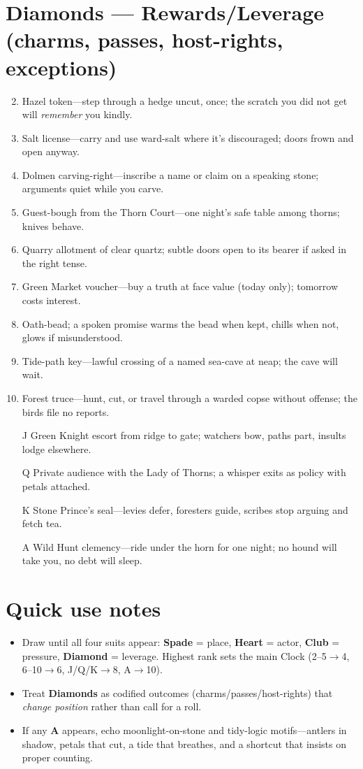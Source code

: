 \section{Diamonds --- Rewards/Leverage (charms, passes, host-rights, exceptions)}
\label{sec:aelinnel-rewards}
\begin{enumerate}
\setcounter{enumi}{1}
\item Hazel token---step through a hedge uncut, once; the scratch you did not get will \emph{remember} you kindly.
\item Salt license---carry and use ward-salt where it's discouraged; doors frown and open anyway.
\item Dolmen carving-right---inscribe a name or claim on a speaking stone; arguments quiet while you carve.
\item Guest-bough from the Thorn Court---one night's safe table among thorns; knives behave.
\item Quarry allotment of clear quartz; subtle doors open to its bearer if asked in the right tense.
\item Green Market voucher---buy a truth at face value (today only); tomorrow costs interest.
\item Oath-bead; a spoken promise warms the bead when kept, chills when not, glows if misunderstood.
\item Tide-path key---lawful crossing of a named sea-cave at neap; the cave will wait.
\item Forest truce---hunt, cut, or travel through a warded copse without offense; the birds file no reports.
\item[J] Green Knight escort from ridge to gate; watchers bow, paths part, insults lodge elsewhere.
\item[Q] Private audience with the Lady of Thorns; a whisper exits as policy with petals attached.
\item[K] Stone Prince's seal---levies defer, foresters guide, scribes stop arguing and fetch tea.
\item[A] Wild Hunt clemency---ride under the horn for one night; no hound will take you, no debt will sleep.
\end{enumerate}

\section*{Quick use notes}
\label{sec:aelinnel-quick-use}
\begin{itemize}
\item Draw until all four suits appear: \textbf{Spade} = place, \textbf{Heart} = actor, \textbf{Club} = pressure, \textbf{Diamond} = leverage. Highest rank sets the main Clock (2--5$\rightarrow$4, 6--10$\rightarrow$6, J/Q/K$\rightarrow$8, A$\rightarrow$10).
\item Treat \textbf{Diamonds} as codified outcomes (charms/passes/host-rights) that \emph{change position} rather than call for a roll.
\item If any \textbf{A} appears, echo moonlight-on-stone and tidy-logic motifs---antlers in shadow, petals that cut, a tide that breathes, and a shortcut that insists on proper counting.
\end{itemize}

